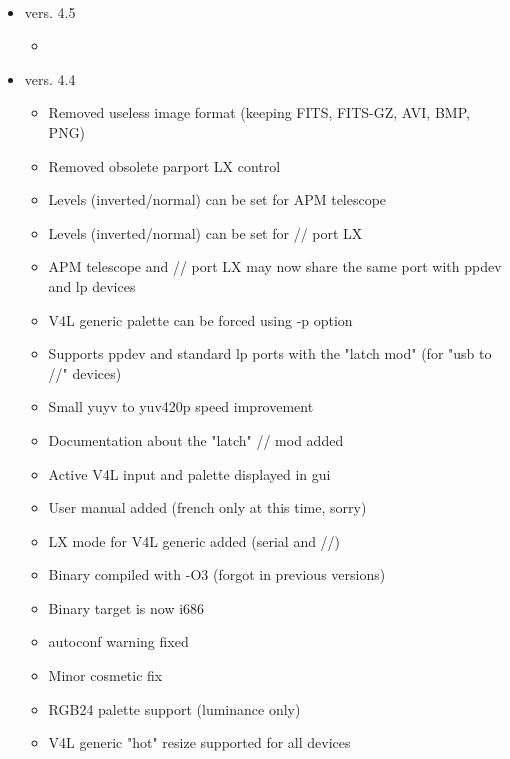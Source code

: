 \documentclass[11pt,a4paper]{book}
\begin{document}
\paragraph*{}
\renewcommand\labelitemi{\textbullet}
\begin{itemize}
\item vers. 4.5
\begin{itemize}
\item 
\end{itemize}
\item vers. 4.4
\begin{itemize}
\item Removed useless image format (keeping FITS, FITS-GZ, AVI, BMP, PNG)
\item Removed obsolete parport LX control
\item Levels (inverted/normal) can be set for APM telescope
\item Levels (inverted/normal) can be set for // port LX
\item APM telescope and // port LX may now share the same port with ppdev and lp devices
\item V4L generic palette can be forced using -p option
\item Supports ppdev and standard lp ports with the "latch mod" (for "usb to //" devices)
\item Small yuyv to yuv420p speed improvement
\item Documentation about the "latch" // mod added
\item Active V4L input and palette displayed in gui
\item User manual added (french only at this time, sorry)
\item LX mode for V4L generic added (serial and //)
\item Binary compiled with -O3 (forgot in previous versions)
\item Binary target is now i686
\item autoconf warning fixed
\item Minor cosmetic fix
\item RGB24 palette support (luminance only)
\item V4L generic "hot" resize supported for all devices
\end{itemize}

\end{itemize}
\end{document}
